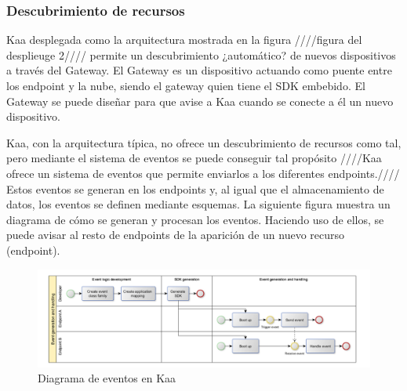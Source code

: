 \documentclass[12pt, twoside]{book}
\begin{document}
\subsubsection*{Descubrimiento de recursos}
Kaa desplegada como la arquitectura mostrada en la figura ////figura del desplieuge 2//// permite un descubrimiento ¿automático? de nuevos dispositivos a través del Gateway. El Gateway es un dispositivo actuando como puente entre los endpoint y la nube, siendo el gateway quien tiene el SDK embebido. El Gateway se puede diseñar para que avise a Kaa cuando se conecte a él un nuevo dispositivo. 


Kaa, con la arquitectura típica, no ofrece un descubrimiento de recursos como tal, pero mediante el sistema de eventos se puede conseguir tal propósito
////Kaa ofrece un sistema de eventos que permite enviarlos a los diferentes endpoints.//// Estos eventos se generan en los endpoints y, al igual que el almacenamiento de datos, los eventos se definen mediante esquemas. La siguiente figura muestra un diagrama de cómo se generan y procesan los eventos. Haciendo uso de ellos, se puede avisar al resto de endpoints de la aparición de un nuevo recurso (endpoint).
\begin{figure}[H]
\centering
\includegraphics[scale=0.5]{images/events_schema}
\caption{Diagrama de eventos en Kaa}\label{L506}
\end{figure} 
\end{document}
